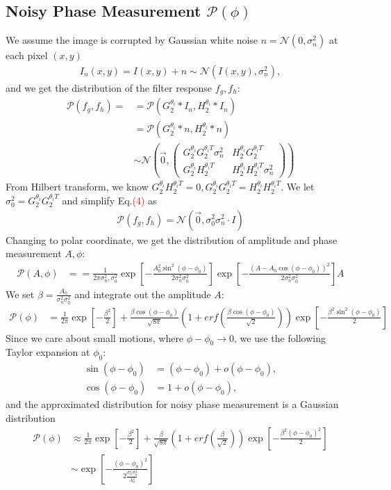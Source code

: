 \documentclass{article}
\newcommand{\nc}{\textcolor{red}}
\begin{document}
\subsection{Noisy Phase Measurement $\mathcal{P}(\phi)$}
We assume the image is corrupted by Gaussian white noise $n=\mathcal{N}(0,\sigma_n^2)$ at each pixel $(x,y)$ 
\begin{align}
I_n(x,y) = I(x,y)+n\sim\mathcal{N}(I(x,y),\sigma_n^2),
\end{align}
and we get the distribution of the filter response $f_g,f_h$:
\begin{align}
\mathcal{P}(f_g,f_h)=  
&=\mathcal{P}(G_2^{\theta_i}\ast I_n,H_2^{\theta_i}\ast I_n)\nonumber\\ 
&=\mathcal{P}(G_2^{\theta_i}\ast n,H_2^{\theta_i}\ast n)\nonumber\\ 
&\sim\mathcal{N}(\vec 0, \left( \begin{array}{cc} G_2^{\theta_i}G_2^{\theta_iT}\sigma_n^2&H_2^{\theta_i}G_2^{\theta_iT}\\G_2^{\theta_i}H_2^{\theta_iT}&H_2^{\theta_i}H_2^{\theta_iT}\sigma_n^2\end{array}\right))
\end{align}
From Hilbert transform, we know $G_2^{\theta_i}H_2^{\theta_iT}=0, G_2^{\theta_i}G_2^{\theta_iT}=H_2^{\theta_i}H_2^{\theta_iT}$. We let $\sigma_0^2=G_2^{\theta_i}G_2^{\theta_iT}$ and simplify Eq.\nc{(4)} as 
\begin{align}
\mathcal{P}(f_g,f_h) = \mathcal{N}(\vec 0,\sigma_0^2\sigma_n^2\cdot I)
\end{align}
Changing to polar coordinate, we get the distribution of amplitude and phase measurement $A,\phi$:
\begin{align}
\mathcal{P}(A,\phi)&= =\frac{1}{2\pi\sigma_n^2,\sigma_0^2}\exp\left[-\frac{A_0^2\sin^2(\phi-\phi_0)}{2\sigma_n^2\sigma_0^2}\right]\exp\left[-\frac{(A-A_0\cos(\phi-\phi_0))^2}{2\sigma_n^2\sigma_0^2}\right]A
\end{align}
We set $\beta=\frac{A_0}{\sigma_n^2\sigma_0^2}$ and integrate out the amplitude $A$:
\begin{align}
\mathcal{P}(\phi)&=\frac{1}{2\pi}\exp\left[-\frac{\beta^2}{2}\right]
+\frac{\beta\cos(\phi-\phi_0)}{\sqrt{8\pi}}
(1+erf\left(\frac{\beta\cos(\phi-\phi_0)}{\sqrt{2}}\right))
\exp\left[-\frac{\beta^2\sin^2(\phi-\phi_0)}{2}\right]
\end{align}
Since we care about small motions, where $\phi-\phi_0\rightarrow 0$, 
we use the following Taylor expansion at $\phi_0$:
\begin{align}
\sin(\phi-\phi_0)&=(\phi-\phi_0)+o(\phi-\phi_0), \nonumber\\ 
\cos(\phi-\phi_0)&=1+o(\phi-\phi_0)\nonumber,
\end{align}
and the approximated distribution for noisy phase measurement is a Gaussian distribution
\begin{align}
\mathcal{P}(\phi)&\approx\frac{1}{2\pi}\exp\left[-\frac{\beta^2}{2}\right]
+\frac{\beta}{\sqrt{8\pi}}
(1+erf\left(\frac{\beta}{\sqrt{2}}\right))
\exp\left[-\frac{\beta^2(\phi-\phi_0)^2}{2}\right]\nonumber\\
&\sim \exp\left[-\frac{(\phi-\phi_0)^2}{2\frac{\sigma_n^4\sigma_0^4}{A_0^2}}\right]
\end{align}
\end{document}
